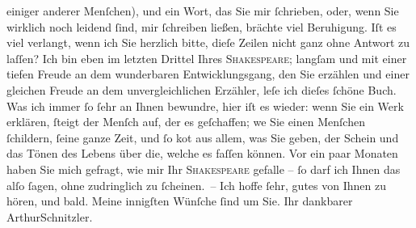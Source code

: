 \begin{ledgroupsized}[t]{13cm}
               einiger anderer Menſchen), und ein Wort, das Sie mir ſchrieben, oder, wenn Sie
               wirklich noch lei{\pb}dend ſind, mir ſchreiben ließen,
               brächte viel Beruhigung. Iſt es viel verlangt, wenn ich Sie herzlich bitte, dieſe
               Zeilen nicht ganz ohne Antwort zu laſſen?\pend
           \pstart
           Ich \introOben{}bin\introOben{} eben im letzten Drittel Ihres \textsc{Shakespeare}; langſam und mit einer tiefen Freude an dem wunderbaren {\pb}Entwicklungsgang, den Sie erzählen und einer
               gleichen Freude an dem unvergleichlichen Erzähler, leſe ich dieſes ſchöne Buch. Was
               ich immer ſo ſehr an Ihnen bewundre, hier iſt es wieder: wenn Sie ein Werk erklären,
               ſteigt der Menſch auf, der es geſchaffen; we{\geminationn} Sie einen
               Menſchen ſchildern, ſeine ganze Zeit, und {\pb}ſo ko{\geminationm}t aus allem, was
               Sie geben, der Schein und das Tönen des Lebens über die, welche es faſſen können. Vor
               ein paar Monaten haben Sie mich gefragt, wie mir Ihr \textsc{Shakespeare} gefalle – ſo darf ich Ihnen das alſo ſagen, ohne zudringlich zu ſcheinen. –\pend
           \pstart Ich hoffe ſehr, gutes von Ihnen zu hören, und bald. Meine innigſten Wünſche ſind
               um Sie. Ihr dankbarer \spacefill\mbox{ArthurSchnitzler.}\pend{}
         
         \endnumbering{}\end{ledgroupsized}  \newcommand{\dateiname}{L00696}\newcommand{\titel}{Arthur Schnitzler an Georg Brandes, 9. 7. 1897}\newcommand{\editorInnen}{Martin Anton Müller und Gerd-Hermann Susen}
      